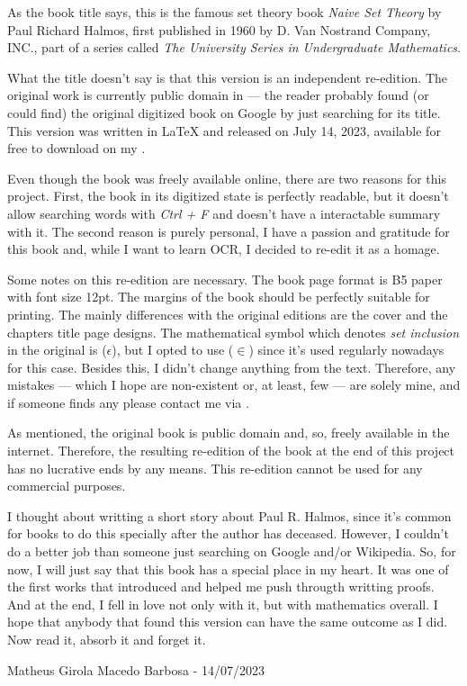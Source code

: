 As the book title says, this is the famous set theory book \textit{Naive Set Theory} by Paul Richard Halmos, first published in 1960 by D. Van Nostrand Company, INC., part of a series called \textit{ The University Series in Undergraduate Mathematics}.

What the title doesn't say is that this version is an independent re-edition. The original work is currently public domain in \href{https://babel.hathitrust.org}{\color{blue}{Hathi Trust Digital Library}} — the reader probably found (or could find) the original digitized book on Google by just searching for its title. This version was written in LaTeX and released on July 14, 2023, available for free to download on my \href{https://github.com/matheusgirola/Halmos-Naive-Set-Theory-OCR-LaTeX-Reedition}{\color{blue}{Github repository}}.

Even though the book was freely available online, there are two reasons for this project. First, the book in its digitized state is perfectly readable, but it doesn't allow searching words with \textit{Ctrl + F} and doesn't have a interactable summary with it. The second reason is purely personal, I have a passion and gratitude for this book and, while I want to learn OCR, I decided to re-edit it as a homage.

Some notes on this re-edition are necessary. The book page format is B5 paper with font size 12pt. The margins of the book should be perfectly suitable for printing. The mainly differences with the original editions are the cover and the chapters title page designs. The mathematical symbol which denotes \textit{set inclusion} in the original is ($\epsilon$), but I opted to use ($\in$) since it's used regularly nowadays for this case. Besides this, I didn't change anything from the text. Therefore, any mistakes — which I hope are non-existent or, at least, few —  are solely mine, and if someone finds any please contact me via  \href{mailto:matheusgirola@gmail.com}{\color{blue}{e-mail}}.

As mentioned, the original book is public domain and, so, freely available in the internet. Therefore, the resulting re-edition of the book at the end of this project has no lucrative ends by any means. This re-edition cannot be used for any commercial purposes.

I thought about writting a short story about Paul R. Halmos, since it's common for books to do this specially after the author has deceased. However, I couldn't do a better job than someone just searching on Google and/or Wikipedia. So, for now, I will just say that this book has a special place in my heart. It was one of the first works that introduced and helped me push througth writting proofs. And at the end, I fell in love not only with it, but with mathematics overall. I hope that anybody that found this version can have the same outcome as I did. Now read it, absorb it and forget it.

\begin{flushright}
Matheus Girola Macedo Barbosa - 14/07/2023
\end{flushright}
